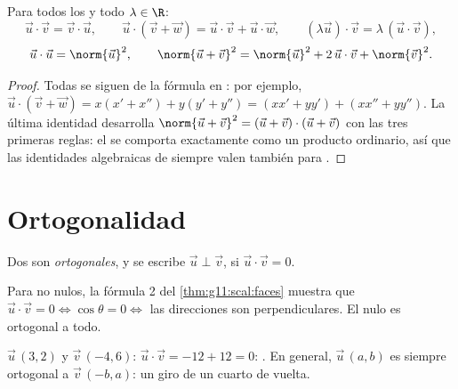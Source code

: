 \begin{proposition}\label{prop:g11:scal:rules}
Para todos los  y todo $\lambda \in \R$:
\[
\vec u \cdot \vec v = \vec v \cdot \vec u, \qquad
\vec u \cdot (\vec v + \vec w) = \vec u \cdot \vec v + \vec u \cdot
\vec w, \qquad
(\lambda \vec u)\cdot \vec v = \lambda\,(\vec u \cdot \vec v),
\]
\[
\vec u \cdot \vec u = \norm{\vec u}^2,
\qquad
\norm{\vec u + \vec v}^2 = \norm{\vec u}^2 + 2\,\vec u\cdot\vec v +
\norm{\vec v}^2 .
\]
\end{proposition}

\begin{proof}
Todas se siguen de la fórmula en : por ejemplo,
$\vec u \cdot (\vec v + \vec w) = x(x' + x'') + y(y' + y'') =
(xx' + yy') + (xx'' + yy'')$. La última identidad desarrolla
$\norm{\vec u + \vec v}^2 = (\vec u + \vec v)\cdot(\vec u + \vec v)$ con
las tres primeras reglas: el  se comporta exactamente como
un producto ordinario, así que las identidades algebraicas de siempre
valen también para .
\end{proof}

\section{Ortogonalidad}

\begin{definition}\label{def:g11:scal:orthogonal}
Dos  son \emph{ortogonales}, y se
escribe $\vec u \perp \vec v$, si $\vec u \cdot \vec v = 0$.
\end{definition}

\begin{remark}
Para  no nulos, la fórmula 2 del \cref{thm:g11:scal:faces}
muestra que $\vec u \cdot \vec v = 0 \iff \cos\theta = 0 \iff$ las
direcciones son perpendiculares. El  nulo es ortogonal a todo.
\end{remark}

\begin{example}
$\vec u\,(3, 2)$ y $\vec v\,(-4, 6)$:
$\vec u \cdot \vec v = -12 + 12 = 0$: . En general,
$\vec u\,(a, b)$ es siempre ortogonal a $\vec v\,(-b, a)$: un giro de un
cuarto de vuelta.
\end{example}

